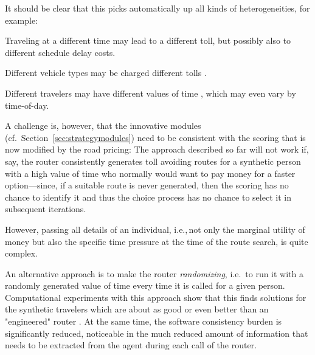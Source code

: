 It should be clear that this picks automatically up all kinds of heterogeneities, for example:
\begin{compactitem}

\item Traveling at a different time may lead to a different toll, but possibly also to different schedule delay costs.  

\item Different vehicle types may be charged different tolls \citep{KickhoeferNagel2012EmissionInternalization}.

\item Different travelers may have different values of time \citep{NagelKickhoeferJoubertHeterogeneousVoTs}, which may even vary by time-of-day.
  
\end{compactitem}

A challenge is, however, that the innovative modules (cf.~Section~\ref{sec:strategymodules}) need to be consistent with the scoring that is now modified by the road pricing: The approach described so far will not work if, say, the router consistently generates toll avoiding routes for a synthetic person with a high value of time who normally would want to pay money for a faster option---since, if a suitable route is never generated, then the scoring has no chance to identify it and thus the choice process has no chance to select it in subsequent iterations.

However, passing all details of an individual, i.e.,\,not only the marginal utility of money but also the specific time pressure at the time of the route search, is quite complex.

An alternative approach is to make the router \emph{randomizing}, i.e.\ to run it with a randomly generated value of time every time it is called for a given person.  Computational experiments with this approach show that this finds solutions for the synthetic travelers which are about as good or even better than an "engineered" router \citep{NagelKickhoeferJoubertHeterogeneousVoTs}.  At the same time, the software consistency burden is significantly reduced, noticeable in the much reduced amount of information that needs to be extracted from the agent during each call of the router.

